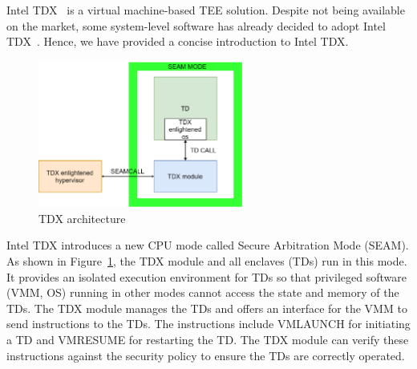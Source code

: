 Intel TDX~\cite*{Intel_tdx_whitepaper} is a virtual machine-based TEE solution. Despite not being available on the market, some system-level software has already decided to adopt Intel TDX~\cite*{Kate_support_tdx, Linux_support_tdx}. Hence, we have provided a concise introduction to Intel TDX.
\begin{figure}[htp]
  \centering
  \includegraphics[width=0.6\textwidth]{images/td_arch.png}
  \caption[TDX architecture]{TDX architecture}
  \label{fig:td_arch}
\end{figure}
Intel TDX introduces a new CPU mode called Secure Arbitration Mode (SEAM). As shown in Figure~\ref{fig:td_arch}, the TDX module and all enclaves (TDs) run in this mode. It provides an isolated execution environment for TDs so that privileged software (VMM, OS) running in other modes cannot access 
the state and memory of the TDs. The TDX module manages the TDs and offers an interface for the VMM to send instructions to the TDs. The instructions include VMLAUNCH for initiating a TD and VMRESUME for restarting the TD. The TDX module can verify these instructions against the security 
policy to ensure the TDs are correctly operated.
